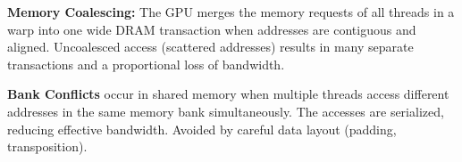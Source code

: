 \begin{definition}
	\textbf{Memory Coalescing:} The GPU merges the memory requests of all threads in a warp into one wide DRAM transaction when addresses are contiguous and aligned. Uncoalesced access (scattered addresses) results in many separate transactions and a proportional loss of bandwidth.
\end{definition}

\begin{definition}
	\textbf{Bank Conflicts} occur in shared memory when multiple threads access different addresses in the same memory bank simultaneously. The accesses are serialized, reducing effective bandwidth. Avoided by careful data layout (padding, transposition).
\end{definition}